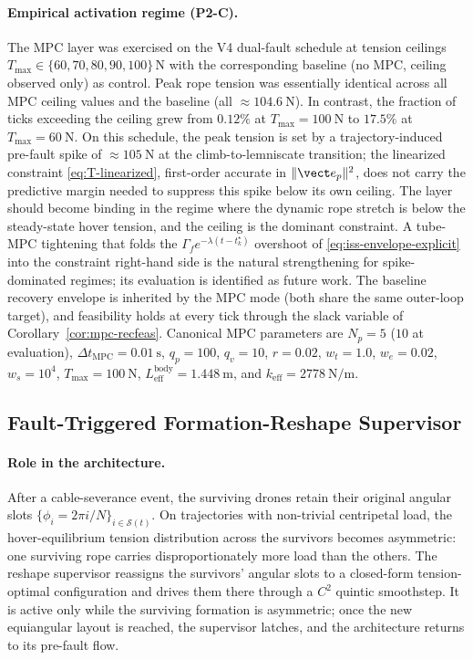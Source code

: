 \paragraph{Empirical activation regime (P2-C).} The MPC layer was exercised on the V4 dual-fault schedule at tension ceilings $T_{\max} \in \{60, 70, 80, 90, 100\}\,\mathrm{N}$ with the corresponding baseline (no MPC, ceiling observed only) as control. Peak rope tension was essentially identical across all MPC ceiling values and the baseline (all $\approx \SI{104.6}{\newton}$). In contrast, the fraction of ticks exceeding the ceiling grew from $0.12\%$ at $T_{\max} = \SI{100}{\newton}$ to $17.5\%$ at $T_{\max} = \SI{60}{\newton}$. On this schedule, the peak tension is set by a trajectory-induced pre-fault spike of $\approx \SI{105}{\newton}$ at the climb-to-lemniscate transition; the linearized constraint \eqref{eq:T-linearized}, first-order accurate in $\|\vect e_p\|^2$, does not carry the predictive margin needed to suppress this spike below its own ceiling. The layer should become binding in the regime where the dynamic rope stretch is below the steady-state hover tension, and the ceiling is the dominant constraint. A tube-MPC tightening that folds the $\Gamma_f e^{-\lambda(t-t_k^\star)}$ overshoot of \eqref{eq:iss-envelope-explicit} into the constraint right-hand side is the natural strengthening for spike-dominated regimes; its evaluation is identified as future work. The baseline recovery envelope is inherited by the MPC mode (both share the same outer-loop target), and feasibility holds at every tick through the slack variable of Corollary~\ref{cor:mpc-recfeas}. Canonical MPC parameters are $N_p = 5$ ($10$ at evaluation), $\Delta t_{\mathrm{MPC}} = \SI{0.01}{\second}$, $q_p = 100$, $q_v = 10$, $r = 0.02$, $w_t = 1.0$, $w_e = 0.02$, $w_s = 10^4$, $T_{\max} = \SI{100}{\newton}$, $L_{\mathrm{eff}}^{\mathrm{body}} = \SI{1.448}{\metre}$, and $k_{\mathrm{eff}} = \SI{2778}{\newton\per\metre}$.

\subsection{Fault-Triggered Formation-Reshape Supervisor}
\label{sec:reshape-supervisor}

\paragraph{Role in the architecture.} After a cable-severance event, the surviving drones retain their original angular slots $\{\phi_i = 2\pi i / N\}_{i \in \mathcal{S}(t)}$. On trajectories with non-trivial centripetal load, the hover-equilibrium tension distribution across the survivors becomes asymmetric: one surviving rope carries disproportionately more load than the others. The reshape supervisor reassigns the survivors' angular slots to a closed-form tension-optimal configuration and drives them there through a $C^2$ quintic smoothstep. It is active only while the surviving formation is asymmetric; once the new equiangular layout is reached, the supervisor latches, and the architecture returns to its pre-fault flow.

